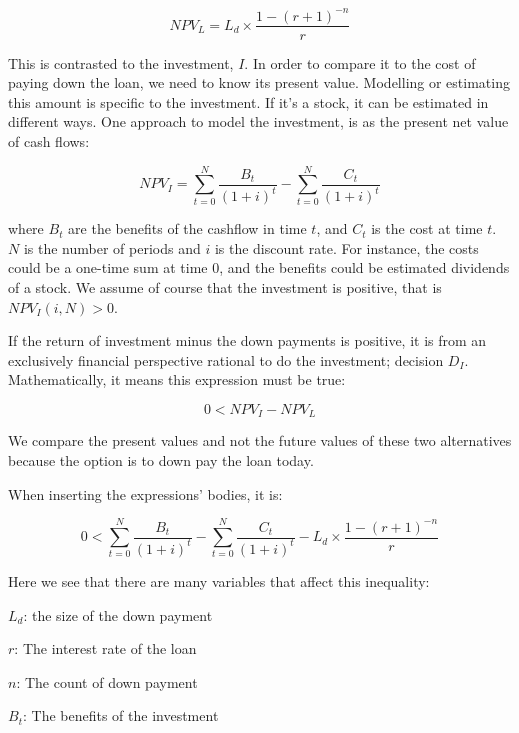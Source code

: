 \documentclass[a4paper]{article}
\begin{document}
\def\NPVL{L_d \times \frac{1 - (r + 1)^{-n}}{r}}

\begin{equation}
NPV_L=\NPVL
\end{equation}

This is contrasted to the investment, $I$. In order to compare it to the cost of
paying down the loan, we need to know its present value. Modelling or estimating
this amount is specific to the investment. If it's a stock, it can be estimated
in different ways. One approach to model the investment, is as the present net
value of cash flows:

\def\NPV_I{\sum_{t=0}^{N} \frac{B_t}{(1 + i)^t} -
           \sum_{t=0}^{N} \frac{C_t}{(1 + i)^t}}

\begin{equation}
NPV_I = \NPV_I
\end{equation}

where $B_t$ are the benefits of the cashflow in time $t$, and $C_t$ is the cost
at time $t$. $N$ is the number of periods and $i$ is the discount rate. For
instance, the costs could be a one-time sum at time $0$, and the benefits could
be estimated dividends of a stock. We assume of course that the investment is
positive, that is $NPV_I(i, N) > 0$.

If the return of investment minus the down payments is positive, it is from an
exclusively financial perspective rational to do the investment; decision $D_I$.
Mathematically, it means this expression must be true:

\begin{equation}
0 < NPV_I - NPV_L
\end{equation}

We compare the present values and not the future values of these two
alternatives because the option is to down pay the loan today.

When inserting the expressions' bodies, it is:

\begin{equation}
0 < \NPV_I - \NPVL
\end{equation}

Here we see that there are many variables that affect this inequality:

$L_d$: the size of the down payment

$r$: The interest rate of the loan

$n$: The count of down payment

$B_t$: The benefits of the investment
\end{document}
